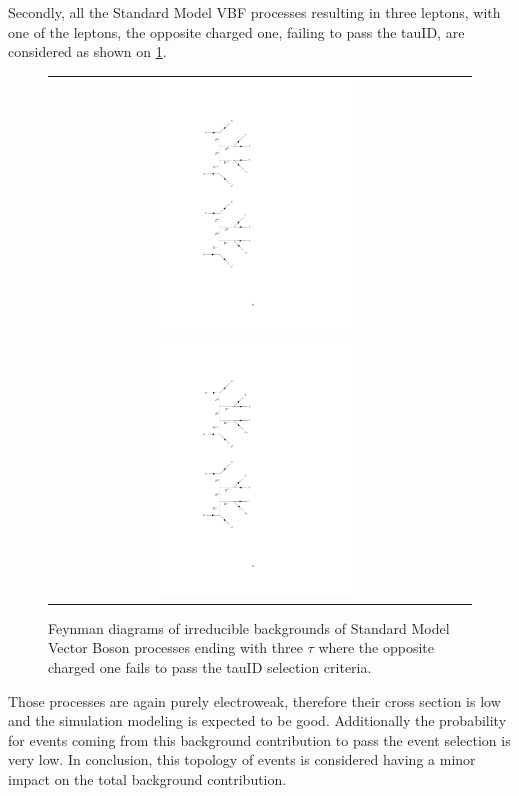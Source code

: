 Secondly, all the Standard Model VBF processes resulting in three leptons, with one of the leptons, the opposite charged one, failing to pass the tauID, are considered as shown on \ref{fig:background_SMVBFZ0Wmiss}.

\begin{figure}[tbh!]
	\centering
	\begin{tabular}{cc}
		\includegraphics[width=0.50\textwidth]{diagrams/pics/background_SMVBFZ0Wmissminus.pdf}
		\includegraphics[width=0.50\textwidth]{diagrams/pics/background_SMVBFZ0Wmissplus.pdf} 		
	\end{tabular}
	\caption{Feynman diagrams of irreducible backgrounds of Standard Model Vector Boson  processes ending with three $\tau$ where the opposite charged one fails to pass the tauID selection criteria. }
	\label{fig:background_SMVBFZ0Wmiss}
\end{figure}

Those processes are again purely electroweak, therefore their cross section is low and the simulation modeling is expected to be good. Additionally the probability for events coming from this background contribution to pass the event selection is very low. In conclusion, this topology of events is considered having a minor impact on the total background contribution.  


